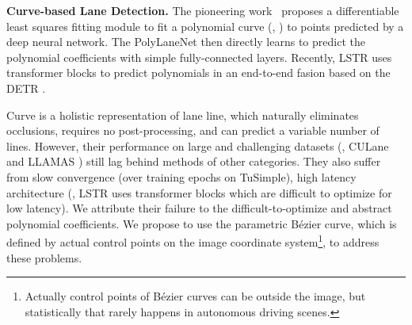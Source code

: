 \documentclass[10pt,twocolumn,letterpaper]{article}
\begin{document}
\noindent \textbf{Curve-based Lane Detection.} The pioneering work~\cite{van2019end} proposes a differentiable least squares fitting module to fit a polynomial curve (\eg, ) to points predicted by a deep neural network. The PolyLaneNet \cite{tabelini2021polylanenet} then directly learns to predict the polynomial coefficients with simple fully-connected layers. Recently, LSTR \cite{liu2021end} uses transformer blocks to predict polynomials in an end-to-end fasion based on the DETR \cite{carion2020end}.

Curve is a holistic representation of lane line, which naturally eliminates occlusions, requires no post-processing, and can predict a variable number of lines. 
However, their performance on large and challenging datasets (\eg, CULane \cite{pan2018spatial} and LLAMAS \cite{llamas2019}) still lag behind methods of other categories. They also suffer from slow convergence (over  training epochs on TuSimple), high latency architecture (\eg, LSTR \cite{liu2021end} uses transformer blocks which are difficult to optimize for low latency). 
We attribute their failure to the difficult-to-optimize and abstract polynomial coefficients. We propose to use the parametric Bézier curve, which is defined by actual control points on the image coordinate system\footnote{Actually control points of Bézier curves can be outside the image, but statistically that rarely happens in autonomous driving scenes.}, to address these problems.




\begin{table}[t]
    \centering
    \caption{Comparison of -order Bézier curves and polynomials () on TuSimple \cite{tusimple} \textit{test} set (\textbf{lower is better}). Since the official metrics are too lose to show any meaningful difference, we use the fine-grained LPD metric following \cite{tabelini2021polylanenet}.}
    \label{tab:gtcompare}
    \vspace{-3mm}
\end{table}
\end{document}
